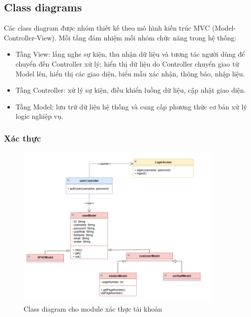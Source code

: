 \subsection{Class diagrams}

Các class diagram được nhóm thiết kế theo mô hình kiến trúc MVC (Model-Controller-View). Mỗi tầng đảm nhiệm mỗi nhóm chức năng trong hệ thống:
\begin{itemize}
    \item Tầng View: lắng nghe sự kiện, thu nhận dữ liệu và tương tác người dùng để chuyển đến Controller xử lý; hiển thị dữ liệu do Controller chuyển giao từ Model lên, hiển thị các
giao diện, biểu mẫu xác nhận, thông báo, nhập liệu.
    \item Tầng Controller: xử lý sự kiện, điều khiển luồng dữ liệu, cập nhật giao diện.
    \item Tầng Model: lưu trữ dữ liệu hệ thống và cung cấp phương thức cơ bản xử lý logic nghiệp
vụ.
\end{itemize}
\subsubsection{Xác thực}
\begin{figure}[H]
    \begin{center}
        \includegraphics[width=0.9\textwidth]{Images/System Modelling/Authen_Class.png}
        \caption{Class diagram cho module xác thực tài khoản}
    \end{center}
\end{figure}

